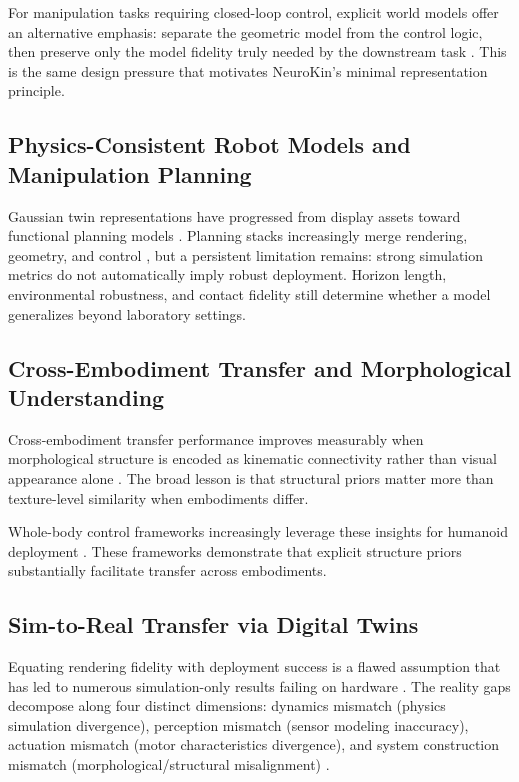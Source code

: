 \documentclass[12pt,a4paper,oneside]{report}
\begin{document}
For manipulation tasks requiring closed-loop control, explicit world models offer an alternative emphasis: separate the geometric model from the control logic, then preserve only the model fidelity truly needed by the downstream task \cite{li2024explicit}. This is the same design pressure that motivates NeuroKin's minimal representation principle.

\subsection{Physics-Consistent Robot Models and Manipulation Planning}

Gaussian twin representations have progressed from display assets toward functional planning models \cite{lou2024robogs, guo2025articulatedgs, yu2025artgs, wu2025reartgs, dai2025freeartgs, chen2025freegaussian}. Planning stacks increasingly merge rendering, geometry, and control \cite{sun2026digitaltwin, lu2024manigaussian, pan2025selfcorrecting, jiang2025gsworld, escontrela2025gaussgym}, but a persistent limitation remains: strong simulation metrics do not automatically imply robust deployment. Horizon length, environmental robustness, and contact fidelity still determine whether a model generalizes beyond laboratory settings.

\subsection{Cross-Embodiment Transfer and Morphological Understanding}

Cross-embodiment transfer performance improves measurably when morphological structure is encoded as kinematic connectivity rather than visual appearance alone \cite{wu2025dexgrasp, patel2024getzero}. The broad lesson is that structural priors matter more than texture-level similarity when embodiments differ.

Whole-body control frameworks increasingly leverage these insights for humanoid deployment \cite{zhao2026agile, liang2025wholebody, ren2026cybowaiter, peng2026eagle, li2026haic}. These frameworks demonstrate that explicit structure priors substantially facilitate transfer across embodiments.

\subsection{Sim-to-Real Transfer via Digital Twins}

Equating rendering fidelity with deployment success is a flawed assumption that has led to numerous simulation-only results failing on hardware \cite{aljalbout2026realitygap}. The reality gaps decompose along four distinct dimensions: dynamics mismatch (physics simulation divergence), perception mismatch (sensor modeling inaccuracy), actuation mismatch (motor characteristics divergence), and system construction mismatch (morphological/structural misalignment) \cite{tan2018simtoreal, aljalbout2026realitygap}.
\end{document}
